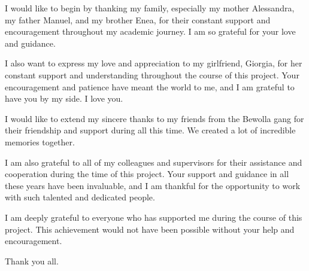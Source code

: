 \begin{acknowledgements}
I would like to begin by thanking my family, especially my mother Alessandra, my father Manuel, and my brother Enea, for their constant support and encouragement throughout my academic journey. I am so grateful for your love and guidance.\newline

\noindent I also want to express my love and appreciation to my girlfriend, Giorgia, for her constant support and understanding throughout the course of this project. Your encouragement and patience have meant the world to me, and I am grateful to have you by my side. I love you.\newline

\noindent I would like to extend my sincere thanks to my friends from the Bewolla gang for their friendship and support during all this time. We created a lot of incredible memories together.\newline

\noindent I am also grateful to all of my colleagues and supervisors for their assistance and cooperation during the time of this project. Your support and guidance in all these years have been invaluable, and I am thankful for the opportunity to work with such talented and dedicated people.\newline

\noindent I am deeply grateful to everyone who has supported me during the course of this project. This achievement would not have been possible without your help and encouragement.\newline

\noindent Thank you all.

\end{acknowledgements}
